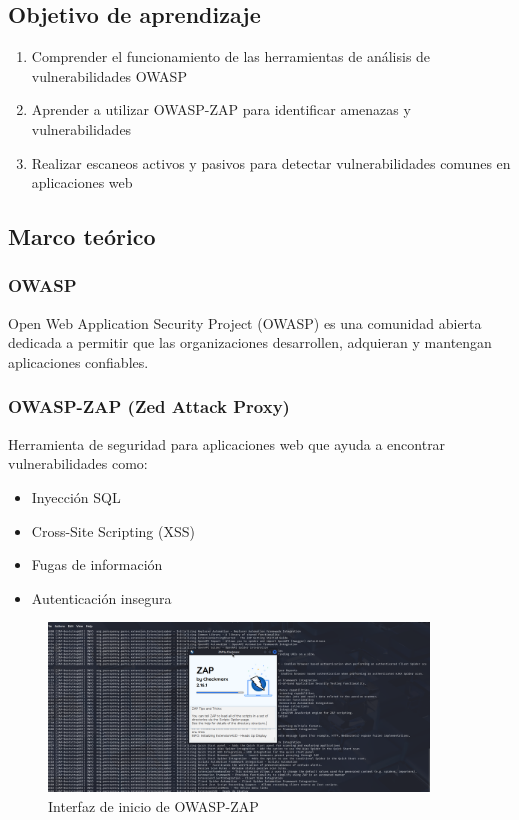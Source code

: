 \documentclass[12pt,a4paper]{article}
\begin{document}
\subsection{Objetivo de aprendizaje}
\begin{enumerate}
    \item Comprender el funcionamiento de las herramientas de análisis de vulnerabilidades OWASP
    \item Aprender a utilizar OWASP-ZAP para identificar amenazas y vulnerabilidades
    \item Realizar escaneos activos y pasivos para detectar vulnerabilidades comunes en aplicaciones web
\end{enumerate}

\subsection{Marco teórico}

\subsubsection{OWASP}
Open Web Application Security Project (OWASP) es una comunidad abierta dedicada a permitir que las organizaciones desarrollen, adquieran y mantengan aplicaciones confiables.

\subsubsection{OWASP-ZAP (Zed Attack Proxy)}
Herramienta de seguridad para aplicaciones web que ayuda a encontrar vulnerabilidades como:
\begin{itemize}
    \item Inyección SQL
    \item Cross-Site Scripting (XSS)
    \item Fugas de información
    \item Autenticación insegura
\end{itemize}

\begin{figure}[H]
\centering
\includegraphics[width=0.9\textwidth]{zap_inicando.png}
\caption{Interfaz de inicio de OWASP-ZAP}
\label{fig:zap_inicio}
\end{figure}
\end{document}
